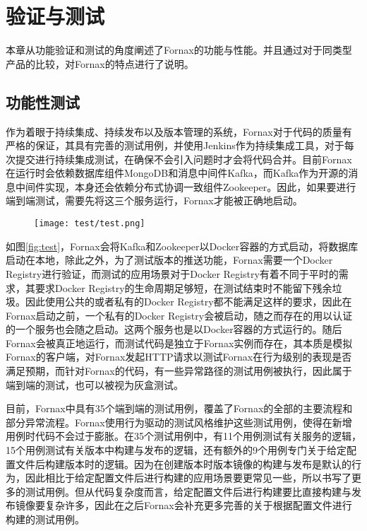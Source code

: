 
\chapter{验证与测试}
\label{chap:test}

本章从功能验证和测试的角度阐述了Fornax的功能与性能。并且通过对于同类型产品的比较，对Fornax的特点进行了说明。

\section{功能性测试}

作为着眼于持续集成、持续发布以及版本管理的系统，Fornax对于代码的质量有严格的保证，其具有完善的测试用例，并使用Jenkins作为持续集成工具，对于每次提交进行持续集成测试，在确保不会引入问题时才会将代码合并。目前Fornax在运行时会依赖数据库组件MongoDB和消息中间件Kafka，而Kafka作为开源的消息中间件实现，本身还会依赖分布式协调一致组件Zookeeper。因此，如果要进行端到端测试，需要先将这三个服务运行，Fornax才能被正确地启动。

\begin{figure}[!htp]
  \centering
  \texttt{[image: test/test.png]}
\end{figure}

如图\ref{fig:test}，Fornax会将Kafka和Zookeeper以Docker容器的方式启动，将数据库启动在本地，除此之外，为了测试版本的推送功能，Fornax需要一个Docker Registry进行验证，而测试的应用场景对于Docker Registry有着不同于平时的需求，其要求Docker Registry的生命周期足够短，在测试结束时不能留下残余垃圾。因此使用公共的或者私有的Docker Registry都不能满足这样的要求，因此在Fornax启动之前，一个私有的Docker Registry会被启动，随之而存在的用以认证的一个服务也会随之启动。这两个服务也是以Docker容器的方式运行的。随后Fornax会被真正地运行，而测试代码是独立于Fornax实例而存在，其本质是模拟Fornax的客户端，对Fornax发起HTTP请求以测试Fornax在行为级别的表现是否满足预期，而针对Fornax的代码，有一些异常路径的测试用例被执行，因此属于端到端的测试，也可以被视为灰盒测试。

目前，Fornax中具有35个端到端的测试用例，覆盖了Fornax的全部的主要流程和部分异常流程。Fornax使用行为驱动的测试风格维护这些测试用例，使得在新增用例时代码不会过于膨胀。在35个测试用例中，有11个用例测试有关服务的逻辑，15个用例测试有关版本中构建与发布的逻辑，还有额外的9个用例专门关于给定配置文件后构建版本时的逻辑。因为在创建版本时版本镜像的构建与发布是默认的行为，因此相比于给定配置文件后进行构建的应用场景要更常见一些，所以书写了更多的测试用例。但从代码复杂度而言，给定配置文件后进行构建要比直接构建与发布镜像要复杂许多，因此在之后Fornax会补充更多完善的关于根据配置文件进行构建的测试用例。

